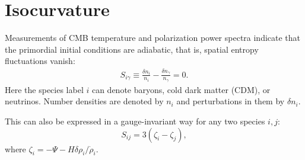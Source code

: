 \section{Isocurvature}
Measurements of CMB temperature and polarization power spectra indicate that the primordial initial conditions are adiabatic, that is, spatial entropy fluctuations vanish:
\begin{align}
S_{i \gamma}\equiv \frac{\delta n_{i}}{n_{i}}-\frac{\delta n_{\gamma}}{n_{\gamma}} =0.
\end{align}
Here the species label $i$ can denote baryons, cold dark matter (CDM), or neutrinos. Number densities are denoted by $n_{i}$ and perturbations in them by $\delta n_{i}$.

This can also be expressed in a gauge-invariant way for any two species $i,j$:
\begin{equation}
S_{ij}=3(\zeta_i-\zeta_j),
\end{equation}
where $\zeta_i = -\Psi - H \delta\rho_i/\dot{\rho}_i$.


